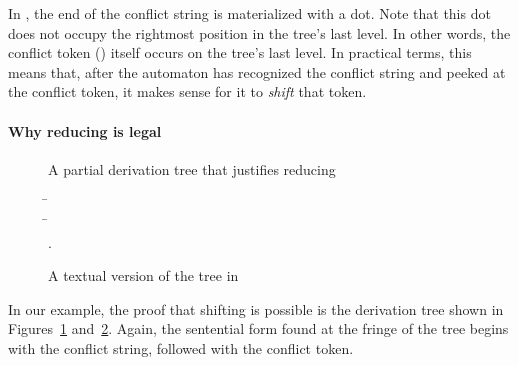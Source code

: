 \documentclass[onecolumn,11pt,nocopyrightspace,preprint]{sigplanconf}
\newenvironment{heveapicture}{
\begin{toimage}
}{
\end{toimage}
\imageflush{}
}
\begin{document}
In , the end of the conflict string is materialized
with a dot. Note that this dot does not occupy the rightmost position in the
tree's last level. In other words, the conflict token () itself
occurs on the tree's last level. In practical terms, this means that, after
the automaton has recognized the conflict string and peeked at the conflict
token, it makes sense for it to \emph{shift} that token.

\paragraph{Why reducing is legal}

\begin{figure}
\mycommonbaseline
\begin{center}
\begin{heveapicture}
\end{heveapicture}
\end{center}
\caption{A partial derivation tree that justifies reducing}
\label{fig:reducing:tree}
\end{figure}

\begin{figure}
\begin{center}
\begin{tabbing}
\=  \\
\>    \=   
                                                               \\
\>                                         \>     .
\end{tabbing}
\end{center}
\caption{A textual version of the tree in }
\label{fig:reducing:text}
\end{figure}

In our example, the proof that shifting is possible is the derivation tree
shown in Figures~\ref{fig:reducing:tree} and~\ref{fig:reducing:text}. Again,
the sentential form found at the fringe of the tree begins with the conflict
string, followed with the conflict token.
\end{document}
